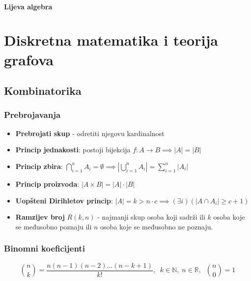 \documentclass[a4paper,12pt,twoside]{report}
\numberwithin{algorithm}{section}
\begin{document}
\subsection{Lijeva algebra}
\label{LijevaAlgebra}


\part{Diskretna matematika i teorija grafova}

\chapter{Kombinatorika}
\section{Prebrojavanja}
\begin{itemize}
    \item \textbf{Prebrojati skup} - odretiti njegovu kardinalnost
    \item \textbf{Princip jednakosti}: postoji bijekcija $f: A \to B \implies |A| = |B|$
    \item \textbf{Princip zbira}: $\bigcap_{i=1}^n A_i = \emptyset \implies |\bigcup_{i=1}^n A_i| = \sum_{i=1}^n |A_i|$
    \item \textbf{Princip proizvoda}: $|A \times B| = |A| \cdot |B|$
    \item \textbf{Uopšteni Dirihletov princip}: $|A| = k > n \cdot c \implies (\exists i)(|A \cap A_i| \geq c + 1)$
    \item \textbf{Ramzijev broj} $R(k, n)$ - najmanji skup osoba koji sadrži ili $k$ osoba koje se međusobno poznaju ili $n$ osoba koje se međusobno ne poznaju.
\end{itemize}


\section{Binomni koeficijenti}
\[
    {{n}\choose k} = \frac{n(n-1)(n-2)\dots(n-k+1)}{k!}, \;\; k \in \mathbb{N}, \; n \in \mathbb{R}, \;\; {{n}\choose 0} = 1
\]
\end{document}
